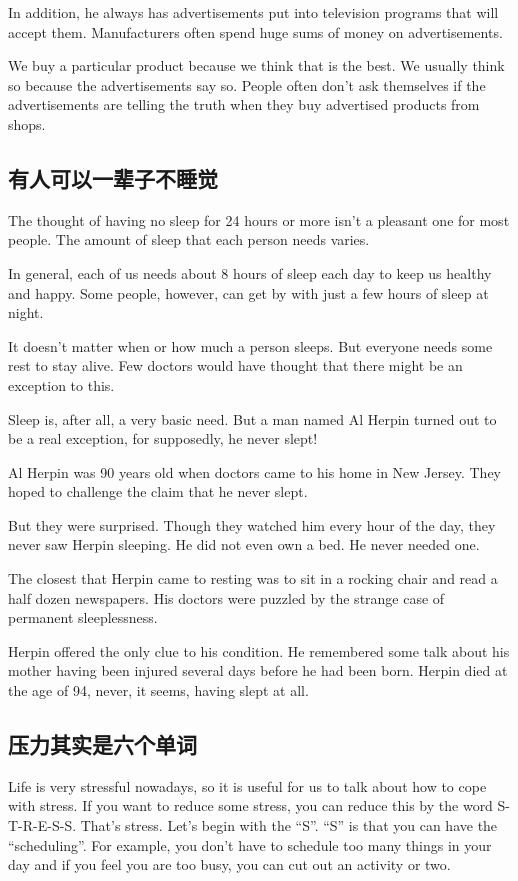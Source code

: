 In addition, he always has advertisements put into television
programs that will accept them. Manufacturers often
spend huge sums of money on advertisements.

We buy a particular product because we think that is the
best. We usually think so because the advertisements say
so. People often don't ask themselves if the advertisements
are telling the truth when they buy advertised products
from shops.

\subsection{有人可以一辈子不睡觉}
The thought of having no sleep for 24 hours or more isn't
a pleasant one for most people. The amount of sleep that
each person needs varies.

In general, each of us needs about 8 hours of sleep each
day to keep us healthy and happy. Some people, however,
can get by with just a few hours of sleep at night.

It doesn't matter when or how much a person sleeps.
But everyone needs some rest to stay alive. Few doctors
would have thought that there might be an exception to this.

Sleep is, after all, a very basic need. But a man named Al
Herpin turned out to be a real exception, for supposedly,
he never slept!

Al Herpin was 90 years old when doctors
came to his home in New Jersey. They hoped to challenge
the claim that he never slept.

But they were surprised. Though they watched him every
hour of the day, they never saw Herpin sleeping. He did
not even own a bed. He never needed one.

The closest that Herpin came to resting was to sit in a
rocking chair and read a half dozen newspapers. His
doctors were puzzled by the strange case of permanent
sleeplessness.

Herpin offered the only clue to his condition. He remembered
some talk about his mother having been injured
several days before he had been born.
Herpin died at the age of 94, never, it seems, having slept
at all.
\subsection{压力其实是六个单词}
Life is very stressful nowadays, so it is useful for us to talk
about how to cope with stress. If you want to reduce some
stress, you can reduce this by the word S-T-R-E-S-S. That's
stress. Let's begin with the “S”. “S” is that you can
have the “scheduling”. For example, you don't have to
schedule too many things in your day and if you feel you
are too busy, you can cut out an activity or two.

